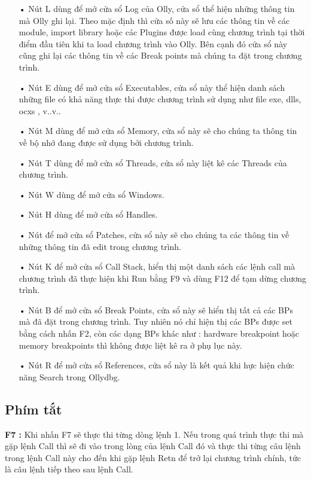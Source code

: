 		\begin{itemize}
			\item[•] 	Nút L dùng để mở cửa sổ Log của Olly, cửa sổ thể hiện những thông tin mà Olly ghi lại. Theo mặc định thì cửa số này sẽ lưu các thông tin về các module, import library hoặc các Plugins được load cùng chương trình tại thời điểm đầu tiên khi ta load chương trình vào Olly. Bên cạnh đó cửa sổ này cũng ghi lại các thông tin về các Break points mà chúng ta đặt trong chương trình.
			\item[• ] Nút E dùng để mở cửa sổ Executables, cửa sổ này thể hiện danh sách những file có khả năng thực thi được chương trình sử dụng như file exe, dlls, ocxs , v..v.. 
			\item[•] Nút M dùng để mở cửa sổ Memory, cửa sổ này sẽ cho chúng ta thông tin về bộ nhớ đang được sử dụng bởi chương trình.
			\item[• ] 	Nút T dùng để mở cửa sổ Threads, cửa sổ này liệt kê các Threads của chương trình.
			\item[•]  	Nút W dùng để mở cửa sổ Windows.
			\item[• ] 	Nút H dùng để mở cửa sổ Handles.
			\item[• ]  Nút \/ để mở cửa sổ Patches, cửa sổ này sẽ cho chúng ta các thông tin về những thông tin đã edit trong chương trình.
			\item[•]  Nút K để mở cửa sổ Call Stack, hiển thị một danh sách các lệnh call mà chương trình  đã thực hiện khi  Run bằng F9 và dùng F12 để tạm dừng chương trình.
			\item[•]  Nút B để mở cửa sổ Break Points, cửa sổ này sẽ hiển thị tất cả các BPs mà đã đặt trong chương trình. Tuy nhiên nó chỉ hiện thị các BPs được set bằng cách nhấn F2, còn các dạng BPs khác như : hardware breakpoint hoặc memory breakpoints thì không được liệt kê ra ở phụ lục này.
			\item[•] Nút R để mở cửa sổ References, cửa sổ này là kết quả khi hực hiện chức năng Search trong Ollydbg.	
		\end{itemize}		
	
	\subsection*{Phím tắt}
	\textbf{F7 : } Khi nhấn F7 sẽ thực thi từng dòng lệnh 1. Nếu trong quá trình thực thi mà gặp lệnh Call thì sẽ đi vào trong lòng của lệnh Call đó và thực thi từng câu lệnh trong lệnh Call này cho đến khi gặp lệnh Retn để trở lại chương trình chính, tức là câu lệnh tiếp theo sau lệnh Call.\\
	

